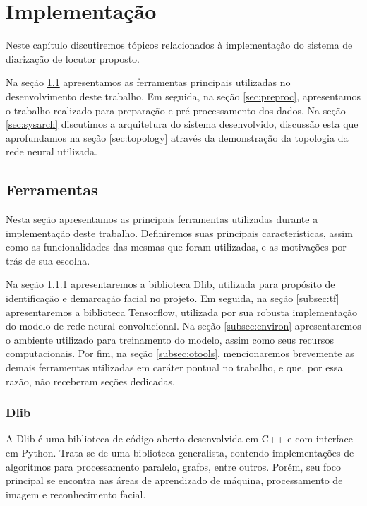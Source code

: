 \chapter{Implementação}
\label{chap:impl}

Neste capítulo discutiremos tópicos relacionados à implementação do sistema de diarização de locutor proposto. 

Na seção \ref{sec:tools} apresentamos as ferramentas principais utilizadas no desenvolvimento deste trabalho.
Em seguida, na seção \ref{sec:preproc}, apresentamos o trabalho realizado para preparação e pré-processamento dos dados.
Na seção \ref{sec:sysarch} discutimos a arquitetura do sistema desenvolvido, discussão esta que aprofundamos na seção \ref{sec:topology} através da demonstração da topologia da rede neural utilizada.

\section{Ferramentas}
\label{sec:tools}

Nesta seção apresentamos as principais ferramentas utilizadas durante a implementação deste trabalho.
Definiremos suas principais características, assim como as funcionalidades das mesmas que foram utilizadas, e as motivações por trás de sua escolha.

Na seção \ref{subsec:dlib} apresentaremos a biblioteca Dlib, utilizada para propósito de identificação e demarcação facial no projeto.
Em seguida, na seção \ref{subsec:tf} apresentaremos a biblioteca Tensorflow, utilizada por sua robusta implementação do modelo de rede neural convolucional.
Na seção \ref{subsec:environ} apresentaremos o ambiente utilizado para treinamento do modelo, assim como seus recursos computacionais.
Por fim, na seção \ref{subsec:otools}, mencionaremos brevemente as demais ferramentas utilizadas em caráter pontual no trabalho, e que, por essa razão, não receberam seções dedicadas.

\subsection{Dlib}
\label{subsec:dlib}
A Dlib\cite{dlib09} é uma biblioteca de código aberto desenvolvida em C++ e com interface em Python.
Trata-se de uma biblioteca generalista, contendo implementações de algoritmos para processamento paralelo, grafos, entre outros.
Porém, seu foco principal se encontra nas áreas de aprendizado de máquina, processamento de imagem e reconhecimento facial.

